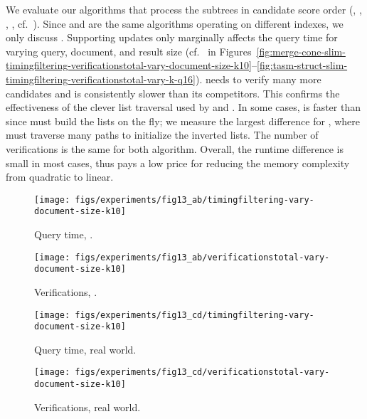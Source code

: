 We evaluate our algorithms that process the subtrees in candidate score order (\lowerboundmergeshort, \coneshort, \shinconeshort, \shinconedynshort, cf.\ ).
%
Since \shinconeshort{} and \shinconedynshort{} are the same algorithms operating on different indexes, we only discuss \shinconeshort{}.
%
Supporting updates only marginally affects the query time for varying query, document, and result size (cf.\ \shinconedynshort{} in Figures~\ref{fig:merge-cone-slim-timingfiltering-verificationstotal-vary-document-size-k10}--\ref{fig:tasm-struct-slim-timingfiltering-verificationstotal-vary-k-q16}).
%
\lowerboundmergeshort{} needs to verify many more candidates and is consistently slower than its competitors. This confirms the effectiveness of the clever list traversal used by \coneshort{} and \shinconeshort. In some cases, \coneshort{} is faster than \shinconeshort{} since \shinconeshort{} must build the lists on the fly; we measure the largest difference for \dblp{}, where \shinconeshort{} must traverse many paths to initialize the inverted lists. The number of verifications is the same for both algorithm. Overall, the runtime difference is small in most cases, thus \shinconeshort{} pays a low price for reducing the memory complexity from quadratic to linear.

\begin{figure*}[ht!]
  \centering
  \begin{subfigure}[b]{0.225\textwidth}
    \centering
    \texttt{[image: figs/experiments/fig13\_ab/timingfiltering-vary-document-size-k10]}
    \caption{Query time, \xmark.}
    \label{fig:merge-cone-slim-timingfiltering-vary-document-size-k10-synthetic}
  \end{subfigure}
  \quad
  \begin{subfigure}[b]{0.225\textwidth}
    \centering
    \texttt{[image: figs/experiments/fig13\_ab/verificationstotal-vary-document-size-k10]}
    \caption{Verifications, \xmark.}
    \label{fig:merge-cone-slim-verificationstotal-vary-document-size-k10-synthetic}
  \end{subfigure}
  \quad
  \begin{subfigure}[b]{0.225\textwidth}
    \centering
    \texttt{[image: figs/experiments/fig13\_cd/timingfiltering-vary-document-size-k10]}
    \caption{Query time, real world.}
    \label{fig:merge-cone-slim-timingfiltering-vary-document-size-k10-realworld}
  \end{subfigure}
  \quad
  \begin{subfigure}[b]{0.225\textwidth}
    \centering
    \texttt{[image: figs/experiments/fig13\_cd/verificationstotal-vary-document-size-k10]}
    \caption{Verifications, real world.}
    \label{fig:merge-cone-slim-verificationstotal-vary-document-size-k10-realworld}
  \end{subfigure}
  \caption{\lowerboundmergeshort{}, \coneshort{}, \shinconeshort{}: Query time and number of verifications over document size, k=10, |Q|=16.}
  \label{fig:merge-cone-slim-timingfiltering-verificationstotal-vary-document-size-k10}
\end{figure*}

